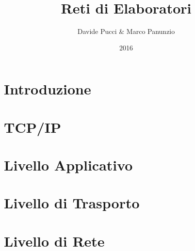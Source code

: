 

\title{Reti di Elaboratori}
\author{Davide Pucci \& Marco Panunzio}
\date{2016}



\maketitle

\tableofcontents

\chapter{Introduzione}


\chapter{TCP/IP}


\chapter{Livello Applicativo}


\chapter{Livello di Trasporto}


\chapter{Livello di Rete}


